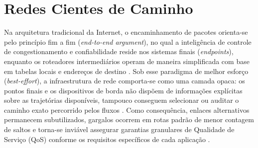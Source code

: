 \section{Redes Cientes de Caminho}
\label{sec:path_aware}

Na arquitetura tradicional da Internet, o encaminhamento de pacotes orienta-se pelo princípio fim a fim (\textit{end-to-end argument}), no qual a inteligência de controle de congestionamento e confiabilidade reside nos sistemas finais (\textit{endpoints}), enquanto os roteadores intermediários operam de maneira simplificada com base em tabelas locais e endereços de destino \cite{postel1981, borges2024pot}. Sob esse paradigma de melhor esforço (\textit{best-effort}), a infraestrutura de rede comporta-se como uma camada opaca: os pontos finais e os dispositivos de borda não dispõem de informações explícitas sobre as trajetórias disponíveis, tampouco conseguem selecionar ou auditar o caminho exato percorrido pelos fluxos \cite{trammell2022rfc, borges2024pot}. Como consequência, enlaces alternativos permanecem subutilizados, gargalos ocorrem em rotas padrão de menor contagem de saltos e torna-se inviável assegurar garantias granulares de Qualidade de Serviço (QoS) conforme os requisitos específicos de cada aplicação \cite{wei2026panqosr}.

